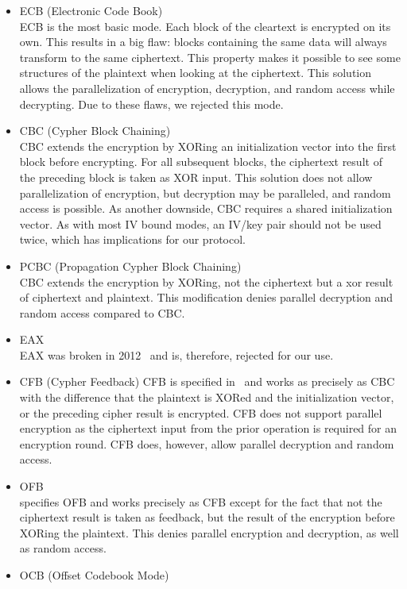 \begin{itemize}
	\item ECB (Electronic Code Book)\\
	ECB is the most basic mode. Each block of the cleartext is encrypted on its own. This results in a big flaw: blocks containing the same data will always transform to the same ciphertext. This property makes it possible to see some structures of the plaintext when looking at the ciphertext. This solution allows the parallelization of encryption, decryption, and random access while decrypting. Due to these flaws, we rejected this mode.
	\item CBC (Cypher Block Chaining)\\  
	CBC extends the encryption by XORing an initialization vector into the first block before encrypting. For all subsequent blocks, the ciphertext result of the preceding block is taken as XOR input. This solution does not allow parallelization of encryption, but decryption may be paralleled, and random access is possible. As another downside, CBC requires a shared initialization vector. As with most IV bound modes, an IV/key pair should not be used twice, which has implications for our protocol.
	\item PCBC (Propagation Cypher Block Chaining)\\
	CBC extends the encryption by XORing, not the ciphertext but a xor result of ciphertext and plaintext. This modification denies parallel decryption and random access compared to CBC.
	\item EAX\\      
	EAX was broken in 2012~\cite{minematsu2013attacks} and is, therefore, rejected for our use.
	\item CFB (Cypher Feedback)
	CFB is specified in~\cite{dworkin2001recommendation} and works as precisely as CBC with the difference that the plaintext is XORed and the initialization vector, or the preceding cipher result is encrypted. CFB does not support parallel encryption as the ciphertext input from the prior operation is required for an encryption round. CFB does, however, allow parallel decryption and random access.
	\item OFB\\
	\cite{dworkin2001recommendation} specifies OFB and works precisely as CFB except for the fact that not the ciphertext result is taken as feedback, but the result of the encryption before XORing the plaintext. This denies parallel encryption and decryption, as well as random access.
	\item OCB (Offset Codebook Mode)\\

\end{itemize}

